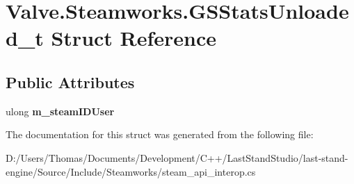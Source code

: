 \hypertarget{structValve_1_1Steamworks_1_1GSStatsUnloaded__t}{}\section{Valve.\+Steamworks.\+G\+S\+Stats\+Unloaded\+\_\+t Struct Reference}
\label{structValve_1_1Steamworks_1_1GSStatsUnloaded__t}
\subsection*{Public Attributes}
\begin{DoxyCompactItemize}
\item 
\hypertarget{structValve_1_1Steamworks_1_1GSStatsUnloaded__t_acb88619ca8d66c126f76539f5a1bfeea}{}ulong {\bfseries m\+\_\+steam\+I\+D\+User}\label{structValve_1_1Steamworks_1_1GSStatsUnloaded__t_acb88619ca8d66c126f76539f5a1bfeea}

\end{DoxyCompactItemize}


The documentation for this struct was generated from the following file\+:\begin{DoxyCompactItemize}
\item 
D\+:/\+Users/\+Thomas/\+Documents/\+Development/\+C++/\+Last\+Stand\+Studio/last-\/stand-\/engine/\+Source/\+Include/\+Steamworks/steam\+\_\+api\+\_\+interop.\+cs\end{DoxyCompactItemize}
